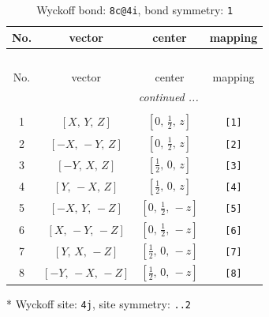 \documentclass[fleqn,8pt]{jsarticle}
\begin{document}
\renewcommand{\arraystretch}{1.2}
\begin{longtable}{cccc}
\caption{Wyckoff bond: {\tt 8c@4i}, bond symmetry: {\tt 1}}
 \\
 \hline \hline
No. & vector & center & mapping \\ \hline \endfirsthead

\multicolumn{3}{l}{\tablename\ \thetable{}} \\
 \hline \hline
No. & vector & center & mapping \\ \hline \endhead

 \hline \hline
\multicolumn{3}{r}{\footnotesize\it continued ...} \\ \endfoot

 \hline \hline
\multicolumn{3}{r}{} \\ \endlastfoot

1 & $\left[ X,\, Y,\, Z \right]$ & $\left[ 0,\, \frac{1}{2},\, z \right]$ & {\tt [1]} \\ \hline
2 & $\left[ - X,\, - Y,\, Z \right]$ & $\left[ 0,\, \frac{1}{2},\, z \right]$ & {\tt [2]} \\ \hline
3 & $\left[ - Y,\, X,\, Z \right]$ & $\left[ \frac{1}{2},\, 0,\, z \right]$ & {\tt [3]} \\ \hline
4 & $\left[ Y,\, - X,\, Z \right]$ & $\left[ \frac{1}{2},\, 0,\, z \right]$ & {\tt [4]} \\ \hline
5 & $\left[ - X,\, Y,\, - Z \right]$ & $\left[ 0,\, \frac{1}{2},\, - z \right]$ & {\tt [5]} \\ \hline
6 & $\left[ X,\, - Y,\, - Z \right]$ & $\left[ 0,\, \frac{1}{2},\, - z \right]$ & {\tt [6]} \\ \hline
7 & $\left[ Y,\, X,\, - Z \right]$ & $\left[ \frac{1}{2},\, 0,\, - z \right]$ & {\tt [7]} \\ \hline
8 & $\left[ - Y,\, - X,\, - Z \right]$ & $\left[ \frac{1}{2},\, 0,\, - z \right]$ & {\tt [8]} \\
\end{longtable}
* Wyckoff site: {\tt 4j}, site symmetry: {\tt ..2}
\renewcommand{\arraystretch}{1.2}
\end{document}
